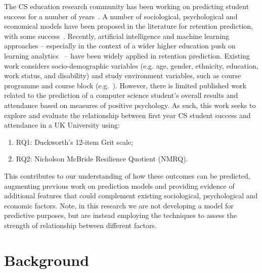 \documentclass[sigconf]{acmart}
\begin{document}

The CS education research community has been working on predicting student success for a number of years~\cite{Robins2010}. A number of sociological, psychological and economical models have been proposed in the literature for retention prediction, with some success~\cite{Seidman2012}. Recently, artificial intelligence and machine learning approaches -- especially in the context of a wider higher education push on learning analytics~\cite{jiscla:2020} -- have been widely applied in retention prediction. Existing work considers socio-demographic variables (e.g. age, gender, ethnicity, education, work status, and disability) and study environment variables, such as course programme and course block (e.g.~\cite{Liao:2019:EVD:3287324.3287407}). However, there is limited published work related to the prediction of a computer science student's overall results and attendance based on measures of positive psychology. As such, this work seeks to explore and evaluate the relationship between first year CS student success and attendance in a UK University using:
\begin{enumerate}
    \item RQ1: Duckworth's 12-item Grit scale;
    \item RQ2: Nicholson McBride Resilience Quotient (NMRQ).
\end{enumerate}
This contributes to our understanding of how these outcomes can be predicted, augmenting previous work on prediction models and providing evidence of additional features that could complement existing sociological, psychological and economic factors. Note, in this research we are not developing a model for predictive purposes, but are instead employing the techniques to assess the strength of relationship between different factors.

\section {Background}

\end{document}
